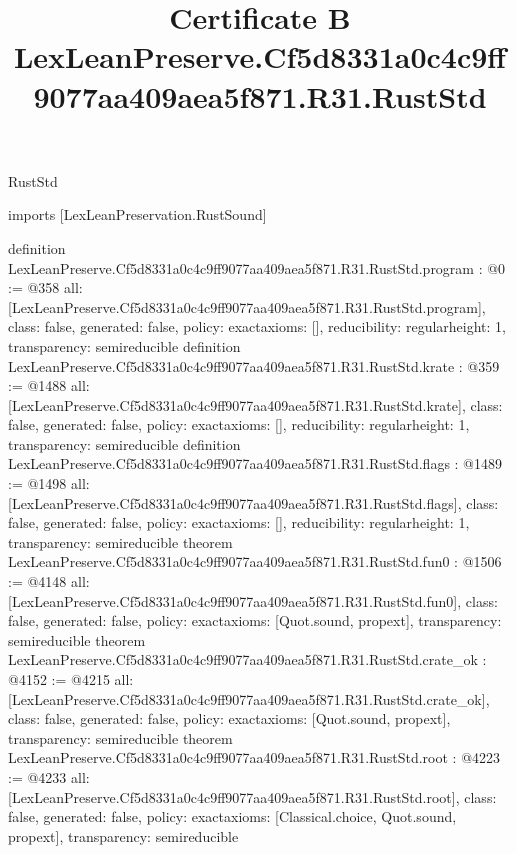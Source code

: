\begin{lexlean}{RustStd}
\title{Certificate B LexLeanPreserve.Cf5d8331a0c4c9ff9077aa409aea5f871.R31.RustStd}
\begin{coremodule}
imports [LexLeanPreservation.RustSound]

definition LexLeanPreserve.Cf5d8331a0c4c9ff9077aa409aea5f871.R31.RustStd.program : @0 := @358 {
  all: [LexLeanPreserve.Cf5d8331a0c4c9ff9077aa409aea5f871.R31.RustStd.program],
  class: false,
  generated: false,
  policy: exact{axioms: []},
  reducibility: regular{height: 1},
  transparency: semireducible
}
definition LexLeanPreserve.Cf5d8331a0c4c9ff9077aa409aea5f871.R31.RustStd.krate : @359 := @1488 {
  all: [LexLeanPreserve.Cf5d8331a0c4c9ff9077aa409aea5f871.R31.RustStd.krate],
  class: false,
  generated: false,
  policy: exact{axioms: []},
  reducibility: regular{height: 1},
  transparency: semireducible
}
definition LexLeanPreserve.Cf5d8331a0c4c9ff9077aa409aea5f871.R31.RustStd.flags : @1489 := @1498 {
  all: [LexLeanPreserve.Cf5d8331a0c4c9ff9077aa409aea5f871.R31.RustStd.flags],
  class: false,
  generated: false,
  policy: exact{axioms: []},
  reducibility: regular{height: 1},
  transparency: semireducible
}
theorem LexLeanPreserve.Cf5d8331a0c4c9ff9077aa409aea5f871.R31.RustStd.fun0 : @1506 := @4148 {
  all: [LexLeanPreserve.Cf5d8331a0c4c9ff9077aa409aea5f871.R31.RustStd.fun0],
  class: false,
  generated: false,
  policy: exact{axioms: [Quot.sound, propext]},
  transparency: semireducible
}
theorem LexLeanPreserve.Cf5d8331a0c4c9ff9077aa409aea5f871.R31.RustStd.crate_ok : @4152 := @4215 {
  all: [LexLeanPreserve.Cf5d8331a0c4c9ff9077aa409aea5f871.R31.RustStd.crate_ok],
  class: false,
  generated: false,
  policy: exact{axioms: [Quot.sound, propext]},
  transparency: semireducible
}
theorem LexLeanPreserve.Cf5d8331a0c4c9ff9077aa409aea5f871.R31.RustStd.root : @4223 := @4233 {
  all: [LexLeanPreserve.Cf5d8331a0c4c9ff9077aa409aea5f871.R31.RustStd.root],
  class: false,
  generated: false,
  policy: exact{axioms: [Classical.choice, Quot.sound, propext]},
  transparency: semireducible
}


\end{coremodule}
\end{lexlean}
